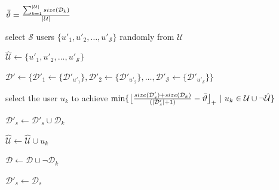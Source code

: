 \documentclass[conference,compsoc]{IEEEtran}
\begin{document}
\begin{algorithm}[t]
\footnotesize
\DontPrintSemicolon

  {
    {$\Bar{\vartheta} = \frac{\sum_{k=1}^{|\mathcal{U}|} size(\mathcal{D}_k)}{|\mathcal{U}|}$}\label{line_cal_avg}
    
    {select $\mathcal{S}$ users $\{ u'_1, u'_2, \dots, u'_{\mathcal{S}} \}$ randomly from $\mathcal{U}$\label{line_select_user}}

    {$\hat{\mathcal{U}} \leftarrow \{ u'_1, u'_2, \dots, u'_{\mathcal{S}} \}$\label{line_setup_u}}

    {$\mathcal{D}' \leftarrow \{\mathcal{D}'_1 \leftarrow \{\mathcal{D}'_{u'_1}\}, \mathcal{D}'_2 \leftarrow \{\mathcal{D}'_{u'_2}\}, \dots, \mathcal{D}'_{\mathcal{S}} \leftarrow \{\mathcal{D}'_{u'_{\mathcal{S}}}\} \}$\label{line_setup_d}}

    {
            
        {          
          {select the user $ u_k $ to achieve $\min \{ \big \lfloor  \frac{size(\mathcal{D}'_s) + size(\mathcal{D}_k)}{(|\mathcal{D}'_s|+1)} - \Bar{\vartheta} \big \rfloor_+ ~|~ u_k \in \mathcal{U} \cup \neg \hat{\mathcal{U}} \}$ \label{line_min}} 
    
          {$\mathcal{D}'_s \leftarrow \mathcal{D}'_s \cup \mathcal{D}_k $}
          
          {$\hat{\mathcal{U}}  \leftarrow \hat{\mathcal{U}} \cup u_k$}
          
          {$\mathcal{D}  \leftarrow \mathcal{D} \cup \neg \mathcal{D}_k$}\label{line_setup_dataset}
        }
        
    }
   
  }
  \Else
  {
    {
        $\mathcal{D}'_s \leftarrow \mathcal{D}_s$\label{line_end}
    }
  }
\caption{User-centered Data Partition}
\label{alg:ucdp}
\end{algorithm}
\end{document}

